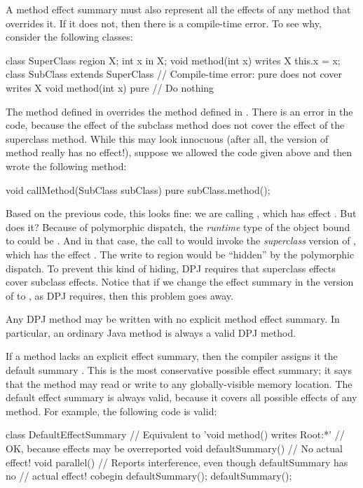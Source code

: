 A method effect summary must also represent all the effects of any
method that overrides it.  If it does not, then there is a
compile-time error.  To see why, consider the following classes:
%
\begin{dpjlisting}
class SuperClass {
  region X;
  int x in X;
  void method(int x) writes X {
    this.x = x;
  }
}
class SubClass extends SuperClass {
  // Compile-time error:  pure does not cover writes X
  void method(int x) pure {
    // Do nothing
  }
}
\end{dpjlisting}
%
The method  defined in  overrides the method
 defined in .  There is an error in the
code, because the effect  of the subclass method does not
cover the effect  of the superclass method.  While this
may look innocuous (after all, the  version of method
really has no effect!), suppose we allowed the code given above and
then wrote the following method:
%
\begin{dpjlisting}
void callMethod(SubClass subClass) pure {
  subClass.method();
}
\end{dpjlisting}
%
Based on the previous code, this looks fine: we are calling
, which has effect .  But does it?
Because of polymorphic dispatch, the \emph{runtime} type of the object
bound to  could be .  And in that case,
the call to  would invoke the \emph{superclass} version of
, which has the effect .  The write to
region  would be ``hidden'' by the polymorphic dispatch.  To
prevent this kind of hiding, DPJ requires that superclass effects
cover subclass effects.  Notice that if we change the effect summary
in the  version of  to , as
DPJ requires, then this problem goes away.

 Any DPJ method may be written with no
explicit method effect summary.  In particular, an ordinary Java
method is always a valid DPJ method.

If a method lacks an explicit effect summary, then the compiler
assigns it the default summary .  This is the most
conservative possible effect summary; it says that the method may read
or write to any globally-visible memory location.  The default effect
summary is always valid, because it covers all possible effects of any
method.  For example, the following code is valid:
%
\begin{dpjlisting}
class DefaultEffectSummary {
    // Equivalent to 'void method() writes Root:*'
    // OK, because effects may be overreported
    void defaultSummary() {
        // No actual effect!
    }
    void parallel() {
        // Reports interference, even though defaultSummary has no
        // actual effect!
        cobegin {
           defaultSummary();
           defaultSummary();
        }
    }
}
\end{dpjlisting}

